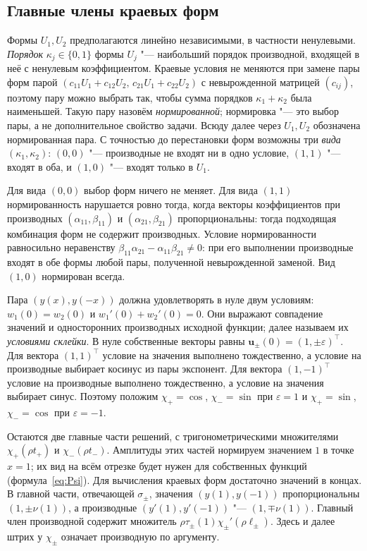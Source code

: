 \documentclass[12pt,a4paper]{article}
\numberwithin{equation}{section}
\theoremstyle{definition}
\begin{document}
\subsection{Главные члены краевых форм}\label{ss:forms}

Формы $U_1,U_2$ предполагаются линейно независимыми, в частности ненулевыми. \emph{Порядок}
$\kappa_j\in\{0,1\}$ формы $U_j$ "--- наибольший порядок производной, входящей в неё с ненулевым
коэффициентом. Краевые условия не меняются при замене пары форм парой
$(c_{11}U_1+c_{12}U_2,\,c_{21}U_1+c_{22}U_2)$ с невырожденной матрицей $(c_{ij})$, поэтому пару
можно выбрать так, чтобы сумма порядков $\kappa_1+\kappa_2$ была наименьшей. Такую пару назовём
\emph{нормированной}; нормировка "--- это выбор пары, а не дополнительное свойство задачи.
Всюду далее через $U_1,U_2$ обозначена нормированная пара. С точностью до перестановки форм возможны три
\emph{вида} $(\kappa_1,\kappa_2)$: $(0,0)$ "--- производные не входят ни в одно условие, $(1,1)$ "---
входят в оба, и $(1,0)$ "--- входят только в $U_1$.

Для вида $(0,0)$ выбор форм ничего не меняет. Для вида $(1,1)$ нормированность нарушается ровно
тогда, когда векторы коэффициентов при производных $(\alpha_{11},\beta_{11})$ и
$(\alpha_{21},\beta_{21})$ пропорциональны: тогда подходящая комбинация форм не содержит
производных. Условие нормированности равносильно неравенству
$\beta_{11}\alpha_{21}-\alpha_{11}\beta_{21}\ne0$: при его выполнении производные входят в обе
формы любой пары, полученной невырожденной заменой. Вид $(1,0)$ нормирован всегда.

Пара $(y(x),y(-x))$ должна удовлетворять в нуле двум условиям:
$w_1(0)=w_2(0)$ и $w_1'(0)+w_2'(0)=0$. Они выражают совпадение значений и
односторонних производных исходной функции; далее называем их \emph{условиями склейки}.
В нуле собственные векторы равны $\mathbf u_\pm(0)=(1,\pm\varepsilon)^\top$.
Для вектора $(1,1)^\top$ условие на значения выполнено тождественно, а условие на
производные выбирает косинус из пары экспонент. Для вектора $(1,-1)^\top$ условие на
производные выполнено тождественно, а условие на значения выбирает синус. Поэтому
положим $\chi_+=\cos$, $\chi_-=\sin$ при $\varepsilon=1$ и
$\chi_+=\sin$, $\chi_-=\cos$ при $\varepsilon=-1$.

Остаются две главные части решений, с тригонометрическими множителями
$\chi_+(\rho t_+)$ и $\chi_-(\rho t_-)$. Амплитуды этих частей нормируем значением $1$
в точке $x=1$; их вид на всём отрезке будет нужен для собственных функций
(формула~\eqref{eq:Psi}). Для вычисления краевых форм достаточно значений в концах.
В главной части, отвечающей $\sigma_\pm$, значения $(y(1),y(-1))$ пропорциональны
$(1,\pm\nu(1))$, а производные $(y'(1),y'(-1))$ "--- $(1,\mp\nu(1))$.
Главный член производной содержит множитель
$\rho\tau_\pm(1)\chi_\pm'(\rho\ell_\pm)$. Здесь и далее штрих у $\chi_\pm$ означает
производную по аргументу.
\end{document}
